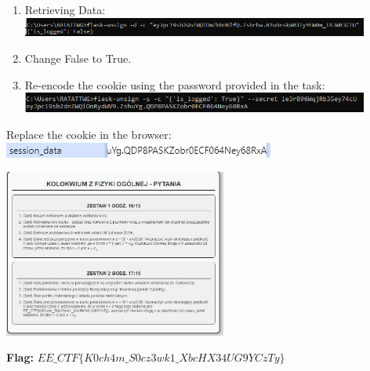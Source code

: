 \documentclass{article}
\begin{document}
\begin{enumerate}[label=\arabic*.]
    \item Retrieving Data:
    \vspace{3mm} \\
    \includegraphics[width=0.9\textwidth]{"image15.png"}
    \item Change False to True.
    \item Re-encode the cookie using the password provided in the task:
    \vspace{3mm} \\
    \includegraphics[width=0.9\textwidth]{"image16.png"}

\end{enumerate}

Replace the cookie in the browser:
\vspace{3mm} \\
\includegraphics[width=\textwidth]{"image17.png"}

\begin{center}
    \includegraphics[width=0.55\textwidth]{"image18.jpeg"}
\end{center}

\textbf{Flag:} $ EE\_CTF\{K0ch4m\_S0cz3wk1\_Xbc
HX34UG9YCzTy\} $

\newpage
\end{document}
